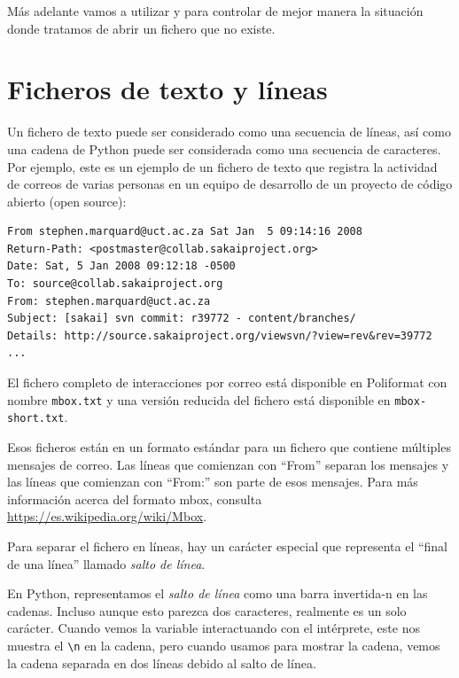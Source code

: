 Más adelante vamos a utilizar  y  para
controlar de mejor manera la situación donde tratamos de abrir un
fichero que no existe.

\hypertarget{ficheros-de-texto-y-luxedneas}{%
\section{Ficheros de texto y líneas}\label{ficheros-de-texto-y-luxedneas}}

Un fichero de texto puede ser considerado como una secuencia de líneas,
así como una cadena de Python puede ser considerada como una secuencia
de caracteres. Por ejemplo, este es un ejemplo de un fichero de texto
que registra la actividad de correos de varias personas en un equipo de
desarrollo de un proyecto de código abierto (open source):

\begin{Verbatim}[frame=single]
From stephen.marquard@uct.ac.za Sat Jan  5 09:14:16 2008
Return-Path: <postmaster@collab.sakaiproject.org>
Date: Sat, 5 Jan 2008 09:12:18 -0500
To: source@collab.sakaiproject.org
From: stephen.marquard@uct.ac.za
Subject: [sakai] svn commit: r39772 - content/branches/
Details: http://source.sakaiproject.org/viewsvn/?view=rev&rev=39772
...
\end{Verbatim}

El fichero completo de interacciones por correo está disponible en Poliformat con nombre \texttt{mbox.txt} y una versión reducida del fichero está disponible en
\texttt{mbox-short.txt}.

Esos ficheros están en un formato estándar para un fichero que contiene
múltiples mensajes de correo. Las líneas que comienzan con ``From''
separan los mensajes y las líneas que comienzan con ``From:'' son parte
de esos mensajes. Para más información acerca del formato mbox, consulta
\url{https://es.wikipedia.org/wiki/Mbox}.

Para separar el fichero en líneas, hay un carácter especial que
representa el ``final de una línea'' llamado \emph{salto de línea}.


En Python, representamos el \emph{salto de línea} como una barra
invertida-n en las cadenas. Incluso aunque esto parezca dos caracteres,
realmente es un solo carácter. Cuando vemos la variable interactuando
con el intérprete, este nos muestra el \verb|\n| en la
cadena, pero cuando usamos  para mostrar la cadena, vemos
la cadena separada en dos líneas debido al salto de línea.

